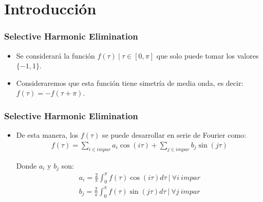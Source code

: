 \section{Introducción}



\begin{frame}
    \frametitle{Selective Harmonic Elimination}

    \begin{itemize}
        \item     Se considerará la función $f(\tau) \ | \ \tau \in [0,\pi]$ que solo puede tomar los valores $\{-1,1\}$.
        \item Consideraremos que esta función tiene simetría de media onda, es decir: $f(\tau) = -f(\tau + \pi)$.
    \end{itemize}

\end{frame}
\begin{frame}
    \frametitle{Selective Harmonic Elimination}
    \begin{itemize}
        \item De esta manera, los $f(\tau)$ se puede desarrollar en serie de Fourier como:
    \begin{gather}
        f(\tau ) = \sum_{i \in impar} a_i \cos(i\tau)+ \sum_{j \in impar}  b_j \sin(j \tau) 
    \end{gather}
    
    Donde $a_i$ y $b_j$  son:
    \begin{gather}
        a_i = \frac{2}{\pi} \int_0^\pi f(\tau ) \cos(i \tau)d\tau \ | \ \forall i \ impar \label{an}\\
        b_j = \frac{2}{\pi} \int_0^\pi f(\tau)  \sin(j \tau) d\tau \ | \ \forall j \ impar \label{bn}
    \end{gather}
    \end{itemize}

\end{frame}
